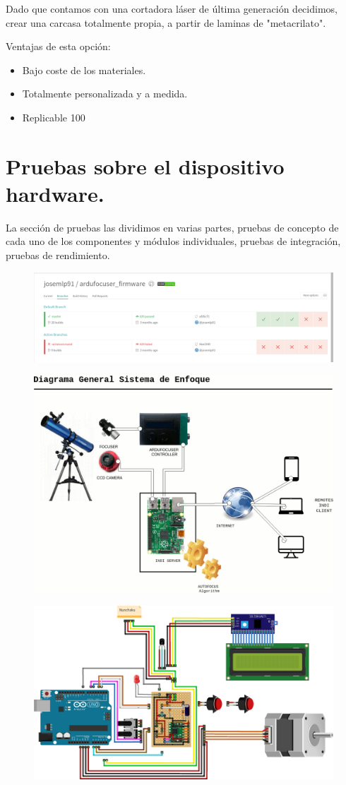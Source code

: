 Dado que contamos con una cortadora láser de última generación decidimos, crear una carcasa totalmente propia, a partir de laminas de "metacrilato".

Ventajas de esta opción:

\begin{itemize}
	\item Bajo coste de los materiales. 
	\item Totalmente personalizada y a medida.
	\item  Replicable 100\textdiscount
\end{itemize}




\section{Pruebas sobre el dispositivo hardware.}


La sección de pruebas las dividimos en varias partes, pruebas de concepto de cada uno de los componentes y módulos individuales, pruebas de integración, pruebas de rendimiento. 




\begin{figure}[h]
\centering
\includegraphics[width=1\linewidth]{../images/travis_ci}
\caption{}
\label{fig:travis_ci}
\end{figure}

\begin{figure}[h]
	\centering
	\includegraphics[width=0.7\linewidth]{../images/diagramaGeneral}
	\caption{}
	\label{fig:diagramaHardware}
\end{figure}


\begin{figure}[h]
	\centering
	\includegraphics[width=0.7\linewidth]{../images/circuito}
	\caption{}
	\label{fig:diagramaHardware}
\end{figure}


